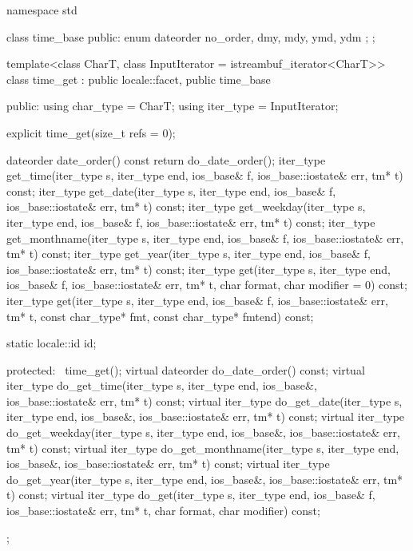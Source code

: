 %
\begin{codeblock}
namespace std {
  class time_base {
  public:
    enum dateorder { no_order, dmy, mdy, ymd, ydm };
  };

  template<class CharT, class InputIterator = istreambuf_iterator<CharT>>
    class time_get : public locale::facet, public time_base {
    public:
      using char_type = CharT;
      using iter_type = InputIterator;

      explicit time_get(size_t refs = 0);

      dateorder date_order() const { return do_date_order(); }
      iter_type get_time(iter_type s, iter_type end, ios_base& f,
                         ios_base::iostate& err, tm* t) const;
      iter_type get_date(iter_type s, iter_type end, ios_base& f,
                         ios_base::iostate& err, tm* t) const;
      iter_type get_weekday(iter_type s, iter_type end, ios_base& f,
                            ios_base::iostate& err, tm* t) const;
      iter_type get_monthname(iter_type s, iter_type end, ios_base& f,
                              ios_base::iostate& err, tm* t) const;
      iter_type get_year(iter_type s, iter_type end, ios_base& f,
                         ios_base::iostate& err, tm* t) const;
      iter_type get(iter_type s, iter_type end, ios_base& f,
                    ios_base::iostate& err, tm* t, char format, char modifier = 0) const;
      iter_type get(iter_type s, iter_type end, ios_base& f,
                    ios_base::iostate& err, tm* t, const char_type* fmt,
                    const char_type* fmtend) const;

      static locale::id id;

    protected:
      ~time_get();
      virtual dateorder do_date_order() const;
      virtual iter_type do_get_time(iter_type s, iter_type end, ios_base&,
                                    ios_base::iostate& err, tm* t) const;
      virtual iter_type do_get_date(iter_type s, iter_type end, ios_base&,
                                    ios_base::iostate& err, tm* t) const;
      virtual iter_type do_get_weekday(iter_type s, iter_type end, ios_base&,
                                       ios_base::iostate& err, tm* t) const;
      virtual iter_type do_get_monthname(iter_type s, iter_type end, ios_base&,
                                         ios_base::iostate& err, tm* t) const;
      virtual iter_type do_get_year(iter_type s, iter_type end, ios_base&,
                                    ios_base::iostate& err, tm* t) const;
      virtual iter_type do_get(iter_type s, iter_type end, ios_base& f,
                               ios_base::iostate& err, tm* t, char format, char modifier) const;
    };
}
\end{codeblock}

